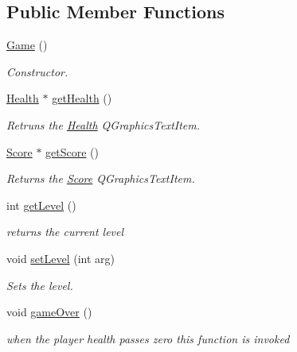\subsection*{Public Member Functions}
\begin{DoxyCompactItemize}
\item 
\mbox{\label{classGame_ad59df6562a58a614fda24622d3715b65}} 
\hyperlink{classGame_ad59df6562a58a614fda24622d3715b65}{Game} ()
\begin{DoxyCompactList}\small\item\em Constructor. \end{DoxyCompactList}\item 
\mbox{\label{classGame_a0628da809900ad86c1f1968fef3ae620}} 
\hyperlink{classHealth}{Health} $\ast$ \hyperlink{classGame_a0628da809900ad86c1f1968fef3ae620}{get\+Health} ()
\begin{DoxyCompactList}\small\item\em Retruns the \hyperlink{classHealth}{Health} Q\+Graphics\+Text\+Item. \end{DoxyCompactList}\item 
\mbox{\label{classGame_a639ba22fbc6153691a046d18dfe27f3c}} 
\hyperlink{classScore}{Score} $\ast$ \hyperlink{classGame_a639ba22fbc6153691a046d18dfe27f3c}{get\+Score} ()
\begin{DoxyCompactList}\small\item\em Returns the \hyperlink{classScore}{Score} Q\+Graphics\+Text\+Item. \end{DoxyCompactList}\item 
\mbox{\label{classGame_a53141ff044e4aa43f23d7dbed11272f6}} 
int \hyperlink{classGame_a53141ff044e4aa43f23d7dbed11272f6}{get\+Level} ()
\begin{DoxyCompactList}\small\item\em returns the current level \end{DoxyCompactList}\item 
\mbox{\label{classGame_a6ddcd758ee17faece0f59b691ee57457}} 
void \hyperlink{classGame_a6ddcd758ee17faece0f59b691ee57457}{set\+Level} (int arg)
\begin{DoxyCompactList}\small\item\em Sets the level. \end{DoxyCompactList}\item 
\mbox{\label{classGame_ac7d371f3f30513a4f3c57f521fac9b5f}} 
void \hyperlink{classGame_ac7d371f3f30513a4f3c57f521fac9b5f}{game\+Over} ()
\begin{DoxyCompactList}\small\item\em when the player health passes zero this function is invoked \end{DoxyCompactList}\end{DoxyCompactItemize}


